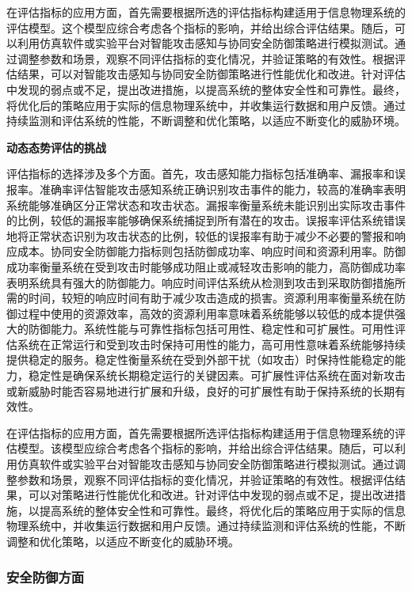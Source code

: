 在评估指标的应用方面，首先需要根据所选的评估指标构建适用于信息物理系统的评估模型。这个模型应综合考虑各个指标的影响，并给出综合评估结果。随后，可以利用仿真软件或实验平台对智能攻击感知与协同安全防御策略进行模拟测试。通过调整参数和场景，观察不同评估指标的变化情况，并验证策略的有效性。根据评估结果，可以对智能攻击感知与协同安全防御策略进行性能优化和改进。针对评估中发现的弱点或不足，提出改进措施，以提高系统的整体安全性和可靠性。最终，将优化后的策略应用于实际的信息物理系统中，并收集运行数据和用户反馈。通过持续监测和评估系统的性能，不断调整和优化策略，以适应不断变化的威胁环境。

\textbf{动态态势评估的挑战}

评估指标的选择涉及多个方面。首先，攻击感知能力指标包括准确率、漏报率和误报率。准确率评估智能攻击感知系统正确识别攻击事件的能力，较高的准确率表明系统能够准确区分正常状态和攻击状态。漏报率衡量系统未能识别出实际攻击事件的比例，较低的漏报率能够确保系统捕捉到所有潜在的攻击。误报率评估系统错误地将正常状态识别为攻击状态的比例，较低的误报率有助于减少不必要的警报和响应成本。协同安全防御能力指标则包括防御成功率、响应时间和资源利用率。防御成功率衡量系统在受到攻击时能够成功阻止或减轻攻击影响的能力，高防御成功率表明系统具有强大的防御能力。响应时间评估系统从检测到攻击到采取防御措施所需的时间，较短的响应时间有助于减少攻击造成的损害。资源利用率衡量系统在防御过程中使用的资源效率，高效的资源利用率意味着系统能够以较低的成本提供强大的防御能力。系统性能与可靠性指标包括可用性、稳定性和可扩展性。可用性评估系统在正常运行和受到攻击时保持可用性的能力，高可用性意味着系统能够持续提供稳定的服务。稳定性衡量系统在受到外部干扰（如攻击）时保持性能稳定的能力，稳定性是确保系统长期稳定运行的关键因素。可扩展性评估系统在面对新攻击或新威胁时能否容易地进行扩展和升级，良好的可扩展性有助于保持系统的长期有效性。

在评估指标的应用方面，首先需要根据所选评估指标构建适用于信息物理系统的评估模型。该模型应综合考虑各个指标的影响，并给出综合评估结果。随后，可以利用仿真软件或实验平台对智能攻击感知与协同安全防御策略进行模拟测试。通过调整参数和场景，观察不同评估指标的变化情况，并验证策略的有效性。根据评估结果，可以对策略进行性能优化和改进。针对评估中发现的弱点或不足，提出改进措施，以提高系统的整体安全性和可靠性。最终，将优化后的策略应用于实际的信息物理系统中，并收集运行数据和用户反馈。通过持续监测和评估系统的性能，不断调整和优化策略，以适应不断变化的威胁环境。

\subsubsection{安全防御方面}

